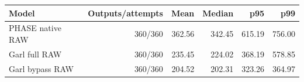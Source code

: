\begin{tabular}{lrrrrr}
\toprule
Model & Outputs/attempts & Mean & Median & p95 & p99 \\
\midrule
PHASE native RAW & 360/360 & 362.56 & 342.45 & 615.19 & 756.00 \\
Garl full RAW & 360/360 & 235.45 & 224.02 & 368.19 & 578.85 \\
Garl bypass RAW & 360/360 & 204.52 & 202.31 & 323.26 & 364.97 \\
\bottomrule
\end{tabular}
